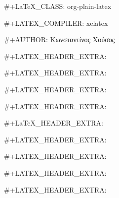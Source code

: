 #+LaTeX_CLASS: org-plain-latex

#+LATEX_COMPILER: xelatex

#+AUTHOR: Κωνσταντίνος Χούσος

#+LATEX_HEADER_EXTRA: \usepackage{xltxtra}
#+LATEX_HEADER_EXTRA: \usepackage{xgreek}
#+LATEX_HEADER_EXTRA: \usepackage{microtype}

#+LATEX_HEADER_EXTRA: \usepackage{minted}
#+LaTeX_HEADER_EXTRA: 

#+LATEX_HEADER_EXTRA: \usepackage[margin=1.3in]{geometry}

#+LATEX_HEADER_EXTRA: \renewcommand{\baselinestretch}{1.2}

#+LATEX_HEADER_EXTRA: \usepackage[colorlinks]{hyperref}
#+LATEX_HEADER_EXTRA: \hypersetup{colorlinks, linkcolor=blue, urlcolor=blue}


